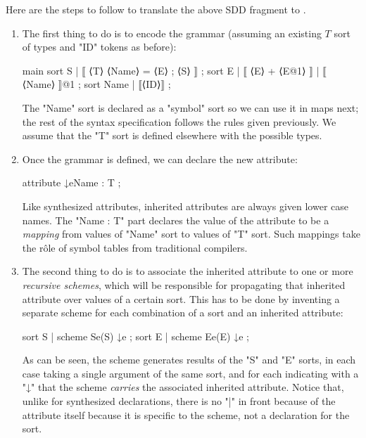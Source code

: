 \documentclass[11pt]{article} %
\begin{document}
Here are the steps to follow to translate the above SDD fragment to \HAX.
\begin{enumerate}

\item The first thing to do is to encode the grammar (assuming an existing $T$ sort of types and
  "ID" tokens as before):
\begin{hacs}
   main sort S  | ⟦ ⟨T⟩ ⟨Name⟩ = ⟨E⟩ ; ⟨S⟩ ⟧ ;
   sort E  | ⟦ ⟨E⟩ + ⟨E@1⟩ ⟧   | ⟦ ⟨Name⟩ ⟧@1 ;
   sort Name | ⟦⟨ID⟩⟧ ;
\end{hacs}
  The "Name" sort is declared as a "symbol" sort so we can use it in maps next; the rest of the
  syntax specification follows the rules given previously. We assume that the "T" sort is defined
  elsewhere with the possible types.

\item Once the grammar is defined, we can declare the new attribute:
\begin{hacs}
   attribute ↓e{Name : T} ;
\end{hacs}
  Like synthesized attributes, inherited attributes are always given lower case names.
  The "{Name : T}" part declares the value of the attribute to be a \emph{mapping} from values of
  "Name" sort to values of "T" sort. Such mappings take the rôle of symbol tables from traditional
  compilers.

\item The second thing to do is to associate the inherited attribute to one or more \emph{recursive
    schemes}, which will be responsible for propagating that inherited attribute over values of a
  certain sort.  This has to be done by inventing a separate scheme for each combination of a sort
  and an inherited attribute:
\begin{hacs}
   sort S | scheme Se(S) ↓e ;
   sort E | scheme Ee(E) ↓e ;
\end{hacs}
  As can be seen, the scheme generates results of the "S" and "E" sorts, in each case taking a
  single argument of the same sort, and for each indicating with a "↓" that the scheme
  \emph{carries} the associated inherited attribute. Notice that, unlike for synthesized
  declarations, there is no "|" in front because of the attribute itself because it is specific to
  the scheme, not a declaration for the sort.


\end{enumerate}
\end{document}
